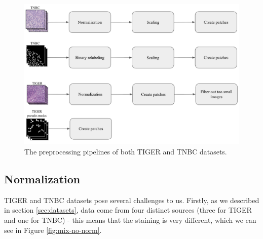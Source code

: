 \begin{figure}[H]
\begin{centering}
\includegraphics[width=\textwidth]{assets/images/for_presentation/dg-preprocessing.png}
\par\end{centering}
\caption{The preprocessing pipelines of both TIGER and TNBC datasets.
\label{fig:dg-preprocessing}}
\end{figure}

\subsection{Normalization} 
TIGER and TNBC datasets pose several challenges to us. Firstly, as we described in section \ref{sec:datasets}, data come from four distinct sources (three for TIGER and one for TNBC) - this means that the staining is very different, which we can see in Figure \ref{fig:mix-no-norm}.

